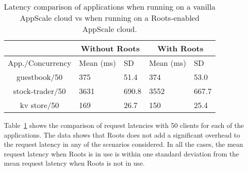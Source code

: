 \begin{table}
\caption{Latency comparison of applications when running on
a vanilla AppScale cloud vs when running on a Roots-enabled
AppScale cloud.}
\label{tab:perf_overhead}
{%
\begin{center}
\begin{tabular}{|c|p{0.8cm}|p{0.8cm}|p{0.8cm}|p{0.8cm}|}
\hline &
      \multicolumn{2}{c|}{Without Roots} &
      \multicolumn{2}{c|}{With Roots} \\ \hline
    App./Concurrency & Mean (ms) & SD & Mean (ms) & SD\\

\hline
guestbook/50 & 375 & 51.4 & 374 & 53.0 \\ \hline
stock-trader/50 & 3631 & 690.8 & 3552 & 667.7 \\ \hline
kv store/50 & 169 & 26.7  & 150 & 25.4  \\ \hline
\end{tabular}
\end{center}
}
\vspace{-0.1in}
\end{table}

Table~\ref{tab:perf_overhead} shows the comparison of request 
latencies with 50 clients for each of the applications. 
The data shows that Roots does not add a significant overhead
to the request latency in any of the scenarios considered. In all the cases,
the mean request latency when Roots is in use is within one standard deviation
from the mean request latency when Roots is not in use.


